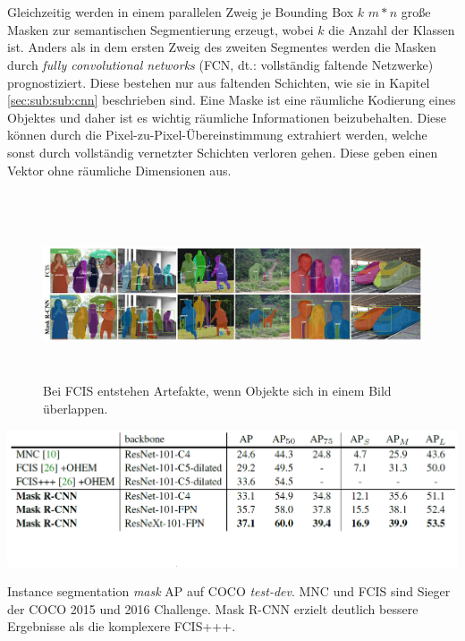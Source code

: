 \\\\
Gleichzeitig werden in einem parallelen Zweig je Bounding Box $k$ $m*n$ große Masken zur semantischen Segmentierung erzeugt, wobei $k$ die Anzahl der Klassen ist.  Anders als in dem ersten Zweig des zweiten Segmentes werden die Masken durch \textit{fully convolutional networks} (FCN, dt.: vollständig faltende Netzwerke) prognostiziert. Diese bestehen nur aus faltenden Schichten, wie sie in Kapitel \ref{sec:sub:sub:cnn} beschrieben sind. Eine Maske ist eine räumliche Kodierung eines Objektes und daher ist es wichtig räumliche Informationen beizubehalten. Diese können durch die Pixel-zu-Pixel-Übereinstimmung extrahiert werden, welche sonst durch vollständig vernetzter Schichten verloren gehen. Diese geben einen Vektor ohne räumliche Dimensionen aus.\cite{ref:maskrcnn}  
\\\\
\begin{figure}[ht]
  \centering
  \includegraphics[width=\textwidth, height=5cm]{pics/mrcnn-vs-fcis.PNG}
  \caption[Mask R-CNN vs. FCIS]{Bei FCIS entstehen Artefakte, wenn Objekte sich in einem Bild überlappen.\cite{ref:maskrcnn}}
  \label{fig:maskvsfcis}
\end{figure}
\begin{table}[ht]
  \centering
  \includegraphics[width=\textwidth]{pics/mrcnn-vs-fcis-vs-mnc.PNG}
  \caption[Mask R-CNN im Vergleich]{Instance segmentation \textit{mask} AP auf COCO \textit{test-dev}. MNC und FCIS sind Sieger der COCO 2015 und 2016 Challenge. Mask R-CNN erzielt deutlich bessere Ergebnisse als die komplexere FCIS+++.\cite{ref:maskrcnn}}
  \label{tab:maskvsfcisvsmnc}
\end{table}
